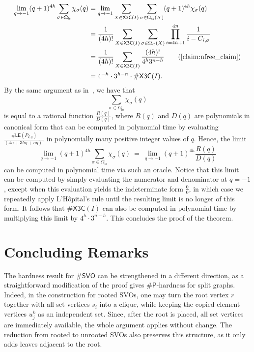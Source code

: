 \documentclass[11pt]{amsart}
\newcommand{\ns}{s}
\newcommand{\omxc}{\Omega_{\mathsf{xc}}}
\newcommand{\omle}{\Omega_{\mathsf{le}}}
\begin{document}
\begin{align*}
   \lim_{q \to -1} (q+1)^{4h} \sum_{\sigma \in \omle} \chi_{\sigma}(q) &= \lim_{q \to -1} \sum_{X \in \mathsf{X3C}(I)} \sum_{\sigma \in \omxc(X)} (q+1)^{4h} \chi_{\sigma}(q) \\
    &= \frac{1}{(4h)!} \sum_{X \in \mathsf{X3C}(I)} \sum_{\sigma \in \omxc(X)} \prod_{i=4h+1}^{4n} \frac{1}{i - C_{i, \sigma}} \\
    &= \frac{1}{(4h)!} \sum_{X \in \mathsf{X3C}(I)} \frac{(4h)!}{4^h3^{n-h}} \tag{\Cref{claim:nfree_claim}} \\
    &= 4^{-h} \cdot 3^{h-n} \cdot \#\mathsf{X3C}(I).
\end{align*}
By the same argument as in~, we have that
\[\sum_{\sigma \in \omle} \chi_{\sigma}(q)\]
is equal to a rational function \(\frac{R(q)}{D(q)}\), where \(R(q)\) and \(D(q)\) are polynomials in canonical form that can be computed in polynomial time by evaluating 
$\frac{\#\mathsf{LE}(P_{I, q})}{(4n+3hq + nq)!}$ in polynomially many positive integer values of $q$. Hence, the limit
\[
\lim_{q\to -1} (q+1)^{4h}
\sum_{\sigma \in \omle} \chi_{\sigma}(q) \ = \ 
\lim_{q\to -1} (q+1)^{4h}\frac{R(q)}{D(q)}
\]
can be computed in polynomial time via such an oracle. Notice that this limit can be computed by simply evaluating the numerator and denominator at $q=-1$, except when this evaluation yields the indeterminate form $\frac{0}{0}$, in which case we repeatedly apply L'Hôpital's rule until the resulting limit is no longer of this form. It follows that \(\#\mathsf{X3C}(I)\) can also be computed in polynomial time by multiplying this limit by \(4^h \cdot 3^{n-h}\). This concludes the proof of the theorem.




\section{Concluding Remarks}

The hardness result for $\#\mathsf{SVO}$ can be strengthened in a different direction, as a straightforward modification of the proof gives $\#\mathsf{P}$-hardness for split graphs. 
Indeed, in the construction for rooted SVOs, one may turn the root vertex $r$ together with all set vertices $\ns_i$ into a clique, while keeping the copied element vertices $u_j^k$ as an independent set. Since, after the root is placed, all set vertices are immediately available, the whole argument applies without change. The reduction from rooted to unrooted SVOs also preserves this structure, as it only adds leaves adjacent to the root.
\end{document}
